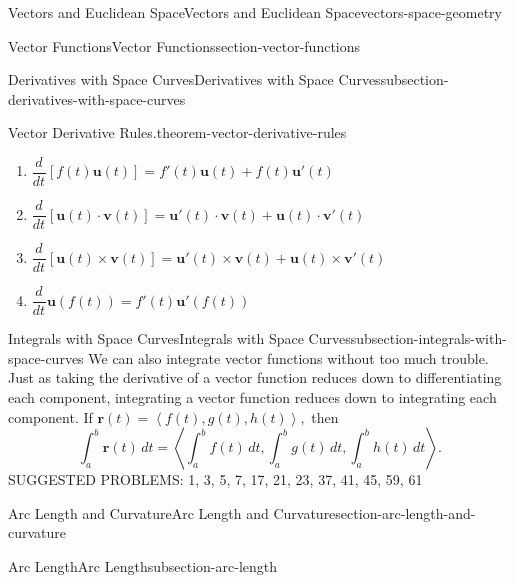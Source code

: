 \documentclass[oneside,10pt,]{book}
\numberwithin{equation}{section}
\newcommand{\vv}[1]{\mathbf{#1}}
\newcommand{\dv}[3][]{\dfrac{d^{#1} #2}{d #3^{#1}}}
\newcommand{\dotprod}[1]{\left\langle #1 \right\rangle}
\begin{document}
\begin{chapterptx}{Vectors and Euclidean Space}{}{Vectors and Euclidean Space}{}{}{vectors-space-geometry}
\begin{sectionptx}{Vector Functions}{}{Vector Functions}{}{}{section-vector-functions}
\begin{subsectionptx}{Derivatives with Space Curves}{}{Derivatives with Space Curves}{}{}{subsection-derivatives-with-space-curves}
\begin{theorem}{Vector Derivative Rules.}{}{theorem-vector-derivative-rules}
\begin{enumerate}
\item\hypertarget{li-130}{}\(\dv{}{t}[f(t)\vv{u}(t)] = f'(t)\vv{u}(t)+f(t)\vv{u}'(t)\)%
\item\hypertarget{li-131}{}\(\dv{}{t}[\vv{u}(t)\cdot\vv{v}(t)] = \vv{u}'(t)\cdot\vv{v}(t)+\vv{u}(t)\cdot\vv{v}'(t)\)%
\item\hypertarget{li-132}{}\(\dv{}{t}[\vv{u}(t)\times\vv{v}(t)] = \vv{u}'(t)\times\vv{v}(t)+\vv{u}(t)\times\vv{v}'(t)\)%
\item\hypertarget{li-133}{}\(\dv{}{t}\vv{u}(f(t)) = f'(t)\vv{u}'(f(t))\)%
\end{enumerate}
\end{theorem}
\end{subsectionptx}
%
%
\typeout{************************************************}
\typeout{************************************************}
%
\begin{subsectionptx}{Integrals with Space Curves}{}{Integrals with Space Curves}{}{}{subsection-integrals-with-space-curves}
\hypertarget{p-1274}{}%
We can also integrate vector functions without too much trouble. Just as taking the derivative of a vector function reduces down to differentiating each component, integrating a vector function reduces down to integrating each component. If \(\vv{r}(t) = \dotprod{f(t),g(t),h(t)},\) then%
%
\begin{equation}
\int_{a}^{b}\vv{r}(t)\,dt = \dotprod{\int_{a}^{b}f(t)\,dt,\int_{a}^{b}g(t)\,dt,\int_{a}^{b}h(t)\,dt}.\label{equation-vector-function-integration}
\end{equation}
\hypertarget{p-1275}{}%
SUGGESTED PROBLEMS: 1, 3, 5, 7, 17, 21, 23, 37, 41, 45, 59, 61%
\end{subsectionptx}
\end{sectionptx}
%
%
\typeout{************************************************}
\typeout{************************************************}
%
\begin{sectionptx}{Arc Length and Curvature}{}{Arc Length and Curvature}{}{}{section-arc-length-and-curvature}
%
%
\typeout{************************************************}
\typeout{************************************************}
%
\begin{subsectionptx}{Arc Length}{}{Arc Length}{}{}{subsection-arc-length}
\hypertarget{p-1276}{}%

\end{subsectionptx}
\end{sectionptx}
\end{chapterptx}
\end{document}
